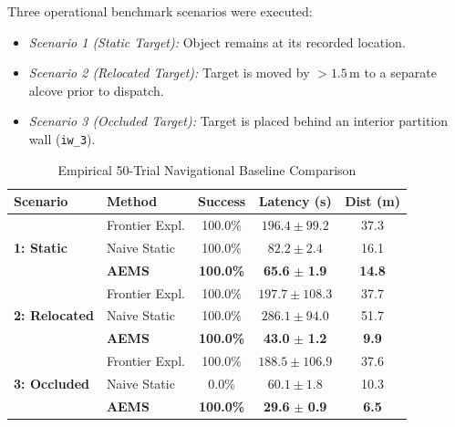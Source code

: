 \documentclass[conference]{IEEEtran}
\begin{document}
Three operational benchmark scenarios were executed:
\begin{itemize}
    \item \textit{Scenario 1 (Static Target):} Object remains at its recorded location.
    \item \textit{Scenario 2 (Relocated Target):} Target is moved by $> 1.5\,\text{m}$ to a separate alcove prior to dispatch.
    \item \textit{Scenario 3 (Occluded Target):} Target is placed behind an interior partition wall (\texttt{iw\_3}).
\end{itemize}

\begin{table}[t]
\centering
\caption{Empirical 50-Trial Navigational Baseline Comparison}
\label{tab:baseline}
\begin{tabular}{llccc}
\toprule
\textbf{Scenario} & \textbf{Method} & \textbf{Success} & \textbf{Latency (s)} & \textbf{Dist (m)} \\
\midrule
\multirow{3}{*}{\textbf{1: Static}} 
 & Frontier Expl. & 100.0\% & $196.4 \pm 99.2$ & 37.3 \\
 & Naive Static   & 100.0\% & $82.2 \pm 2.4$   & 16.1 \\
 & \textbf{AEMS}   & \textbf{100.0\%} & \textbf{65.6} $\pm$ \textbf{1.9} & \textbf{14.8} \\
\midrule
\multirow{3}{*}{\textbf{2: Relocated}} 
 & Frontier Expl. & 100.0\% & $197.7 \pm 108.3$ & 37.7 \\
 & Naive Static   & 100.0\% & $286.1 \pm 94.0$  & 51.7 \\
 & \textbf{AEMS}   & \textbf{100.0\%} & \textbf{43.0} $\pm$ \textbf{1.2} & \textbf{9.9} \\
\midrule
\multirow{3}{*}{\textbf{3: Occluded}} 
 & Frontier Expl. & 100.0\% & $188.5 \pm 106.9$ & 37.6 \\
 & Naive Static   & 0.0\%   & $60.1 \pm 1.8$    & 10.3 \\
 & \textbf{AEMS}   & \textbf{100.0\%} & \textbf{29.6} $\pm$ \textbf{0.9} & \textbf{6.5} \\
\bottomrule
\end{tabular}
\end{table}
\end{document}
